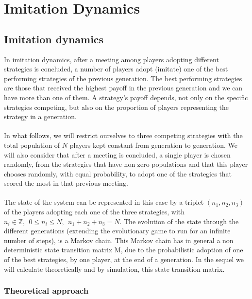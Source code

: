 \documentclass[12pt]{report}
\begin{document}
\chapter{Imitation Dynamics}
\section{Imitation dynamics}

In imitation dynamics, after a meeting among players adopting different strategies is concluded, a number of players adopt (imitate) one of the best performing strategies of the previous generation. The best performing strategies are those that received the highest payoff in the previous generation and we can have more than one of them. A strategy's payoff depends, not only on the specific strategies competing, but also on the proportion of players representing the strategy in a generation.
\\\\
In what follows, we will restrict ourselves to three competing strategies with the total population of $N$ players kept constant from generation to generation. We will also consider that after a meeting is concluded, a single player is chosen randomly, from the strategies that have non zero populations and that this player chooses randomly, with equal probability, to adopt one of the strategies that scored the most in that previous meeting.
\\\\
The state of the system can be represented in this case by a triplet $(n_1,n_2,n_3)$ of the players adopting each one of the three strategies, with $n_i \in \mathbb{Z},\ \ 0 \leq n_i \leq N,\ \ n_1+n_2+n_3=N$. The evolution of the state through the different generations (extending the evolutionary game to run for an infinite number of steps), is a Markov chain. This Markov chain has in general a non deterministic state transition matrix M, due to the probabilistic adoption of one of the best strategies, by one player, at the end of a generation. In the sequel we will calculate theoretically and by simulation, this state transition matrix.

\subsection{Theoretical approach}
\end{document}
